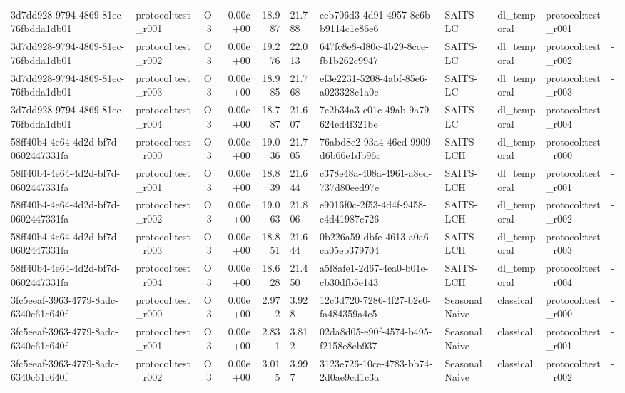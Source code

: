 \begin{table}[htbp]
\begin{tabular}{llrrr}
3d7dd928-9794-4869-81ec-76fbdda1db01 & protocol:test\_r001 & O3 & 0.00e+00 & 18.987 & 21.788 & eeb706d3-4d91-4957-8e6b-b9114c1e86e6 & SAITS-LC & dl\_temporal & protocol:test\_r001 & - \\
3d7dd928-9794-4869-81ec-76fbdda1db01 & protocol:test\_r002 & O3 & 0.00e+00 & 19.276 & 22.013 & 647fc8e8-d80c-4b29-8cce-fb1b262c9947 & SAITS-LC & dl\_temporal & protocol:test\_r002 & - \\
3d7dd928-9794-4869-81ec-76fbdda1db01 & protocol:test\_r003 & O3 & 0.00e+00 & 18.985 & 21.768 & ef3e2231-5208-4abf-85e6-a023328c1a0c & SAITS-LC & dl\_temporal & protocol:test\_r003 & - \\
3d7dd928-9794-4869-81ec-76fbdda1db01 & protocol:test\_r004 & O3 & 0.00e+00 & 18.787 & 21.607 & 7e2b34a3-c01c-49ab-9a79-624ed4f321be & SAITS-LC & dl\_temporal & protocol:test\_r004 & - \\
58ff40b4-4e64-4d2d-bf7d-0602447331fa & protocol:test\_r000 & O3 & 0.00e+00 & 19.036 & 21.705 & 76abd8e2-93a4-46cd-9909-d6b66e1db96c & SAITS-LCH & dl\_temporal & protocol:test\_r000 & - \\
58ff40b4-4e64-4d2d-bf7d-0602447331fa & protocol:test\_r001 & O3 & 0.00e+00 & 18.839 & 21.644 & c378e48a-408a-4961-a8ed-737d80eed97e & SAITS-LCH & dl\_temporal & protocol:test\_r001 & - \\
58ff40b4-4e64-4d2d-bf7d-0602447331fa & protocol:test\_r002 & O3 & 0.00e+00 & 19.063 & 21.806 & e9016f0c-2f53-4d4f-9458-e4d41987c726 & SAITS-LCH & dl\_temporal & protocol:test\_r002 & - \\
58ff40b4-4e64-4d2d-bf7d-0602447331fa & protocol:test\_r003 & O3 & 0.00e+00 & 18.851 & 21.644 & 0b226a59-dbfe-4613-a0a6-ca05eb379704 & SAITS-LCH & dl\_temporal & protocol:test\_r003 & - \\
58ff40b4-4e64-4d2d-bf7d-0602447331fa & protocol:test\_r004 & O3 & 0.00e+00 & 18.628 & 21.450 & a5f8afe1-2d67-4ea0-b01e-cb30dfb5e143 & SAITS-LCH & dl\_temporal & protocol:test\_r004 & - \\
3fc5eeaf-3963-4779-8adc-6340c61c640f & protocol:test\_r000 & O3 & 0.00e+00 & 2.972 & 3.928 & 12c3d720-7286-4f27-b2e0-fa484359a4c5 & SeasonalNaive & classical & protocol:test\_r000 & - \\
3fc5eeaf-3963-4779-8adc-6340c61c640f & protocol:test\_r001 & O3 & 0.00e+00 & 2.831 & 3.812 & 02da8d05-e90f-4574-b495-f2158e8eb937 & SeasonalNaive & classical & protocol:test\_r001 & - \\
3fc5eeaf-3963-4779-8adc-6340c61c640f & protocol:test\_r002 & O3 & 0.00e+00 & 3.015 & 3.997 & 3123e726-10ce-4783-bb74-2d0ae9cd1c3a & SeasonalNaive & classical & protocol:test\_r002 & - \\

\end{tabular}
\end{table}
